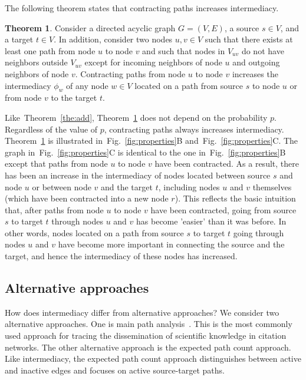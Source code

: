 \documentclass[9pt,twocolumn,twoside,lineno]{pnas-alt}
\theoremstyle{definition}
\newtheorem{theorem}{Theorem}
\newcommand{\subfigref}[2]{Fig.~\ref{fig:#1}#2\xspace}
\newcommand{\theref}[1]{Theorem~\ref{the:#1}\xspace}
\begin{document}
The following theorem states that contracting paths increases intermediacy.

\begin{theorem}
    Consider a directed acyclic graph $G = (V, E)$, a source $s \in V$, and a target $t \in V$. In addition, consider two nodes $u, v \in V$ such that there exists at least one path from node $u$ to node $v$ and such that nodes in $V_{uv}$ do not have neighbors outside $V_{uv}$ except for incoming neighbors of node $u$ and outgoing neighbors of node $v$. Contracting paths from node $u$ to node $v$ increases the intermediacy $\phi_w$ of any node $w \in V$ located on a path from source $s$ to node $u$ or from node $v$ to the target $t$.
    \label{the:cont}
\end{theorem}

Like~\theref{add}, \theref{cont} does not depend on the probability $p$. Regardless of the value of $p$, contracting paths always increases intermediacy. \theref{cont} is illustrated in~\subfigref{properties}{B} and~\subfigref{properties}{C}. The graph in~\subfigref{properties}{C} is identical to the one in~\subfigref{properties}{B} except that paths from node $u$ to node $v$ have been contracted. As a result, there has been an increase in the intermediacy of nodes located between source $s$ and node $u$ or between node $v$ and the target $t$, including nodes $u$ and $v$ themselves (which have been contracted into a new node $r$). This reflects the basic intuition that, after paths from node $u$ to node $v$ have been contracted, going from source $s$ to target $t$ through nodes $u$ and $v$ has become 'easier' than it was before. In other words, nodes located on a path from source $s$ to target $t$ going through nodes $u$ and $v$ have become more important in connecting the source and the target, and hence the intermediacy of these nodes has increased.

%
%

\subsection*{\label{sec:alternative}Alternative approaches}

How does intermediacy differ from alternative approaches? We consider two alternative approaches. One is main path analysis~\cite{Hummon1989}. This is the most commonly used approach for tracing the dissemination of scientific knowledge in citation networks. The other alternative approach is the expected path count approach. Like intermediacy, the expected path count approach distinguishes between active and inactive edges and focuses on active source-target paths.
\end{document}
